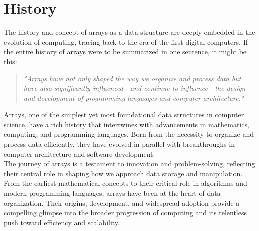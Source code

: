 \documentclass[12pt, oneside]{book}
\begin{document}
\section{History}
The history and concept of arrays as a data structure are deeply embedded in the evolution of computing, tracing back to the era of the first digital computers. If the entire history of arrays were to be summarized in one sentence, it might be this: 
\begin{quote}
	\textit{"Arrays have not only shaped the way we organize and process data but have also significantly influenced—and continue to influence—the design and development of programming languages and computer architecture."}
\end{quote}
Arrays, one of the simplest yet most foundational data structures in computer science, have a rich history that intertwines with advancements in mathematics, computing, and programming languages. Born from the necessity to organize and process data efficiently, they have evolved in parallel with breakthroughs in computer architecture and software development. \\
The journey of arrays is a testament to innovation and problem-solving, reflecting their central role in shaping how we approach data storage and manipulation. From the earliest mathematical concepts to their critical role in algorithms and modern programming languages, arrays have been at the heart of data organization. Their origins, development, and widespread adoption provide a compelling glimpse into the broader progression of computing and its relentless push toward efficiency and scalability.
\end{document}
